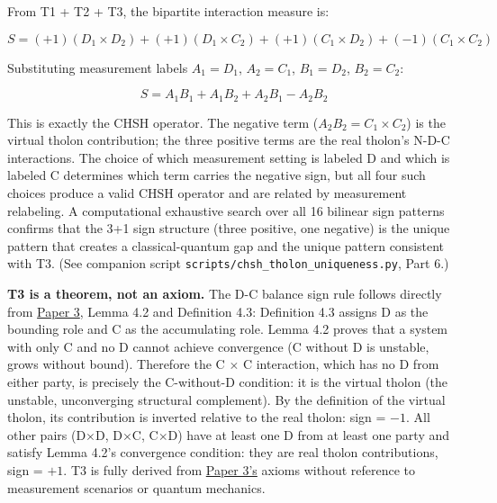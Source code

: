 \documentclass[12pt]{article}
\begin{document}
From T1 + T2 + T3, the bipartite interaction measure is:

\[S = (+1)(D_1 \times D_2) + (+1)(D_1 \times C_2) + (+1)(C_1 \times D_2) + (-1)(C_1 \times C_2)\]

Substituting measurement labels \(A_1 = D_1\), \(A_2 = C_1\),
\(B_1 = D_2\), \(B_2 = C_2\):

\[S = A_1B_1 + A_1B_2 + A_2B_1 - A_2B_2\]

This is exactly the CHSH operator. The negative term
(\(A_2B_2 = C_1 \times C_2\)) is the virtual tholon contribution; the
three positive terms are the real tholon's N-D-C interactions. The
choice of which measurement setting is labeled D and which is labeled C
determines which term carries the negative sign, but all four such
choices produce a valid CHSH operator and are related by measurement
relabeling. A computational exhaustive search over all 16 bilinear sign
patterns confirms that the 3+1 sign structure (three positive, one
negative) is the unique pattern that creates a classical-quantum gap and
the unique pattern consistent with T3. (See companion script
\texttt{scripts/chsh\_tholon\_uniqueness.py}, Part 6.)

\textbf{T3 is a theorem, not an axiom.} The D-C balance sign rule
follows directly from
\href{https://github.com/baardev/truevalue/blob/main/docnav/Research/papers/3_minimal-recursive-triadic-framework/3_minimal-recursive-triadic-framework.pdf}{Paper
3}, Lemma 4.2 and Definition 4.3: Definition 4.3 assigns D as the
bounding role and C as the accumulating role. Lemma 4.2 proves that a
system with only C and no D cannot achieve convergence (C without D is
unstable, grows without bound). Therefore the C \(\times\) C
interaction, which has no D from either party, is precisely the
C-without-D condition: it is the virtual tholon (the unstable,
unconverging structural complement). By the definition of the virtual
tholon, its contribution is inverted relative to the real tholon: sign =
\(-1\). All other pairs (D\(\times\)D, D\(\times\)C, C\(\times\)D) have
at least one D from at least one party and satisfy Lemma 4.2's
convergence condition: they are real tholon contributions, sign =
\(+1\). T3 is fully derived from
\href{https://github.com/baardev/truevalue/blob/main/docnav/Research/papers/3_minimal-recursive-triadic-framework/3_minimal-recursive-triadic-framework.pdf}{Paper
3's} axioms without reference to measurement scenarios or quantum
mechanics.
\end{document}
